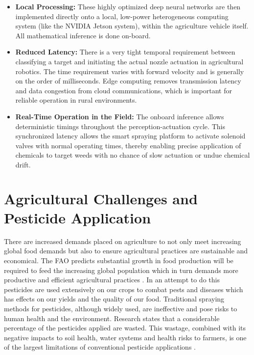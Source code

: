\begin{itemize}
    \item \textbf{Local Processing:} These highly optimized deep neural networks are then implemented directly onto a local, low-power heterogeneous computing system (like the NVIDIA Jetson system), within the agriculture vehicle itself. All mathematical inference is done on-board.
    
    \item \textbf{Reduced Latency:} There is a very tight temporal requirement between classifying a target and initiating the actual nozzle actuation in agricultural robotics. The time requirement varies with forward velocity and is generally on the order of milliseconds. Edge computing removes transmission latency and data congestion from cloud communications, which is important for reliable operation in rural environments.
    \item \textbf{Real-Time Operation in the Field:} The onboard inference allows deterministic timings throughout the perception-actuation cycle. This synchronized latency allows the smart spraying platform to activate solenoid valves with normal operating times, thereby enabling precise application of chemicals to target weeds with no chance of slow actuation or undue chemical drift.
\end{itemize}
    







\section{Agricultural Challenges and Pesticide Application}

There are increased demands placed on agriculture to not only meet increasing global food demands but also to ensure agricultural practices are sustainable and economical. The FAO predicts substantial growth in food production will be required to feed the increasing global population which in turn demands more productive and efficient agricultural practices \cite{FAO2017}. In an attempt to do this pesticides are used extensively on our crops to combat pests and diseases which has effects on our yields and the quality of our food. Traditional spraying methods for pesticides, although widely used, are ineffective and pose risks to human health and the environment. Research states that a considerable percentage of the pesticides applied are wasted. This wastage, combined with its negative impacts to soil health, water systems and health risks to farmers, is one of the largest limitations of conventional pesticide applications \cite{Pimentel2005, Damalas2011}.


